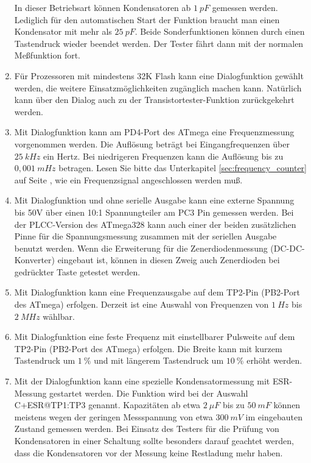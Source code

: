 \begin{enumerate}
In dieser Betriebsart können Kondensatoren ab \(1~pF\) gemessen werden. Lediglich für den automatischen Start der Funktion
braucht man einen Kondensator mit mehr als \(25~pF\).
Beide Sonderfunktionen können durch einen Tastendruck wieder beendet werden. Der Tester fährt dann mit der normalen
Meßfunktion fort.
\item Für Prozessoren mit mindestens 32K Flash kann eine Dialogfunktion gewählt werden, 
die weitere Einsatzmöglichkeiten zugänglich machen kann.
Natürlich kann über den Dialog auch zu der Transistortester-Funktion zurückgekehrt werden.
\item Mit Dialogfunktion kann am PD4-Port des ATmega eine Frequenzmessung vorgenommen werden.
Die Auflösung beträgt bei Eingangfrequenzen über \(25~kHz\) ein Hertz.
Bei niedrigeren Frequenzen kann die Auflösung bis zu \(0,001~mHz\) betragen.
Lesen Sie bitte das Unterkapitel \ref{sec:frequency_counter} auf Seite \pageref{sec:frequency_counter},
wie ein Frequenzsignal angeschlossen werden muß.
\item Mit Dialogfunktion und ohne serielle Ausgabe kann eine externe Spannung bis 50V über einen
10:1 Spannungteiler am PC3 Pin gemessen werden. Bei der PLCC-Version des ATmega328 kann auch einer der beiden
zusätzlichen Pinne für die Spannungsmessung zusammen mit der seriellen Ausgabe benutzt werden.
Wenn die Erweiterung für die Zenerdiodenmessung (DC-DC-Konverter)
eingebaut ist, können in diesen Zweig auch Zenerdioden bei gedrückter Taste getestet werden.
\item Mit Dialogfunktion kann eine Frequenzausgabe auf dem TP2-Pin (PB2-Port des ATmega) erfolgen.
Derzeit ist eine Auswahl von Frequenzen von \(1~Hz\) bis \(2~MHz\) wählbar.
\item Mit Dialogfunktion eine feste Frequenz mit einstellbarer Pulsweite auf dem TP2-Pin (PB2-Port des ATmega) erfolgen.
Die Breite kann mit kurzem Tastendruck um \(1~\%\) und mit längerem Tastendruck um \(10~\%\) erhöht werden.
\item Mit der Dialogfunktion kann eine spezielle Kondensatormessung mit ESR-Messung gestartet werden.
Die Funktion wird bei der Auswahl \mbox{C+ESR@TP1:TP3} genannt.
 Kapazitäten ab etwa \(2~\mu F\) bis zu \(50~mF\) können meistens wegen der geringen Messspannung von etwa \(300~mV\)
 im eingebauten Zustand gemessen werden.
 Bei Einsatz des Testers für die Prüfung von Kondensatoren in einer Schaltung sollte besonders darauf geachtet werden,
 dass die Kondensatoren vor der Messung keine Restladung mehr haben.

\end{enumerate}


